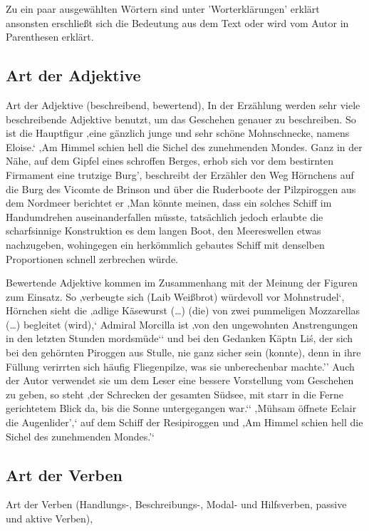 Zu ein paar ausgewählten Wörtern sind unter 'Worterklärungen' erklärt \cite[S.647]{pir} ansonsten erschließt sich die Bedeutung aus dem Text oder wird vom Autor in Parenthesen erklärt.

\subsection{Art der Adjektive}
Art der Adjektive (beschreibend, bewertend),
In der Erzählung werden sehr viele beschreibende Adjektive benutzt, um das Geschehen genauer zu beschreiben. So ist  die Hauptfigur ‚eine gänzlich junge und sehr schöne Mohnschnecke, namens Eloise.‘\cite[S.13]{pir} ‚Am Himmel schien hell die Sichel des zunehmenden Mondes. Ganz in der Nähe, auf dem Gipfel eines schroffen Berges, erhob sich vor dem bestirnten Firmament eine trutzige Burg’,\cite[S.233]{pir} beschreibt der Erzähler den Weg Hörnchens auf die Burg des Vicomte de Brinson und über die Ruderboote der Pilzpiroggen aus dem Nordmeer\cite[S.317]{pir} berichtet er ‚Man könnte meinen, dass ein solches Schiff im Handumdrehen auseinanderfallen müsste, tatsächlich jedoch erlaubte die scharfsinnige Konstruktion es dem langen Boot, den Meereswellen etwas nachzugeben, wohingegen ein herkömmlich gebautes Schiff mit denselben Proportionen schnell zerbrechen würde.\cite[S.317]{pir}

Bewertende Adjektive kommen im Zusammenhang mit der Meinung der Figuren zum Einsatz. So ‚verbeugte sich (Laib Weißbrot) würdevoll vor Mohnstrudel‘,\cite[S.85]{pir} Hörnchen sieht die ‚adlige Käsewurst (…) (die) von zwei pummeligen Mozzarellas (…) begleitet (wird),‘\cite[S.179]{pir} Admiral Morcilla ist ‚von den ungewohnten Anstrengungen in den letzten Stunden mordsmüde‘‘\cite[S.263]{pir} und bei den Gedanken Käptn Li\'s, der sich bei den gehörnten Piroggen aus Stulle, nie ganz sicher sein (konnte), denn in ihre Füllung verirrten sich häufig Fliegenpilze, was sie unberechenbar machte.’’\cite[S.317]{pir} Auch der Autor verwendet sie um dem Leser eine bessere Vorstellung vom Geschehen zu geben, so steht ‚der Schrecken der gesamten Südsee, mit starr in die Ferne gerichtetem Blick da, bis die Sonne untergegangen war.‘‘\cite[S.103]{pir} ‚Mühsam öffnete Eclair die Augenlider’,‘\cite[S.211]{pir} auf dem Schiff der Resipiroggen und ‚Am Himmel schien hell die Sichel des zunehmenden Mondes.’‘\cite[S.233]{pir} 


\subsection{Art der Verben}
Art der Verben (Handlungs-, Beschreibungs-, Modal- und Hilfsverben, passive und aktive Verben),


